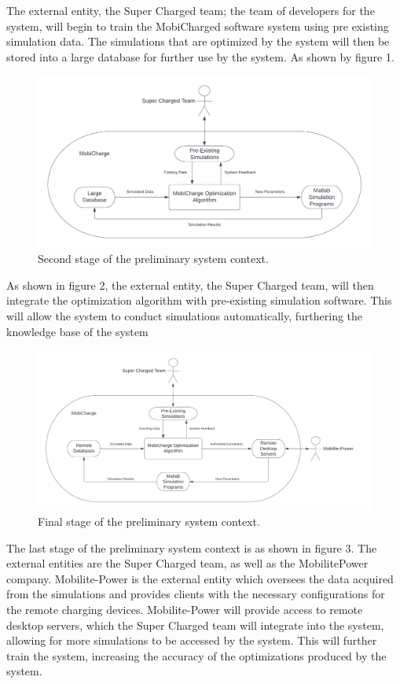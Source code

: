 \documentclass[12pt, titlepage]{article}
\begin{document}
The external entity, the Super Charged team; the team of developers for the system, will begin to train the MobiCharged software system using pre existing simulation data. The simulations that are optimized by the system will then be stored into a large database for further use by the system. As shown by figure 1. \par
\newpage
\begin{figure}[htp]
    \centering
    \includegraphics[width=15cm]{images/context1.png}
    \caption[Prelim System Contexts 2]{Second stage of the preliminary system context.}
    \label{fig:figure2}
\end{figure}
As shown in figure 2, the external entity, the Super Charged team, will then integrate the optimization algorithm with pre-existing simulation software. This will allow the system to conduct simulations automatically, furthering the knowledge base of the system
\newpage
\begin{figure}[htp]
    \centering
    \includegraphics[width=15cm]{images/context2.png}
    \caption[Prelim System Contexts 3]{Final stage of the preliminary system context.}
    \label{fig:figure3}
\end{figure}
The last stage of the preliminary system context is as shown in figure 3. The external entities are the Super Charged team, as well as the MobilitePower company. Mobilite-Power is the external entity which oversees the data acquired from the simulations and provides clients with the necessary configurations for the remote charging devices. Mobilite-Power will provide access to remote desktop servers, which the Super Charged team will integrate into the system, allowing for more simulations to be accessed by the system. This will further train the system, increasing the accuracy of the optimizations produced by the system.
\end{document}
